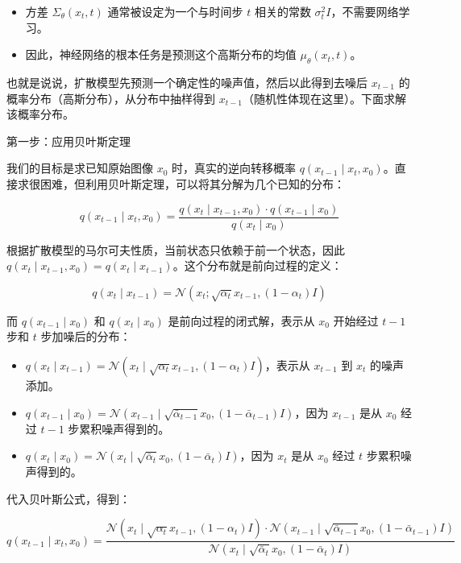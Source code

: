 \begin{itemize}
\tightlist
\item
  方差 \(\Sigma_\theta(x_t,t)\) 通常被设定为一个与时间步 \(t\) 相关的常数 \(\sigma_t^2 I\)，不需要网络学习。
\item
  因此，神经网络的根本任务是预测这个高斯分布的均值 \(\mu_\theta(x_t,t)\)。
\end{itemize}

也就是说说，扩散模型先预测一个确定性的噪声值，然后以此得到去噪后 \(x_{t-1}\) 的概率分布（高斯分布），从分布中抽样得到 \(x_{t-1}\)（随机性体现在这里）。下面求解该概率分布。

第一步：应用贝叶斯定理

我们的目标是求已知原始图像 \(x_0\) 时，真实的逆向转移概率 \(q(x_{t-1}\mid x_t,x_0)\)。直接求很困难，但利用贝叶斯定理，可以将其分解为几个已知的分布：

\[
q(x_{t-1}\mid x_t,x_0)
= \frac{q(x_t\mid x_{t-1},x_0)\cdot q(x_{t-1}\mid x_0)}{q(x_t\mid x_0)}
\]

根据扩散模型的马尔可夫性质，当前状态只依赖于前一个状态，因此 \(q(x_t\mid x_{t-1},x_0)=q(x_t\mid x_{t-1})\)。这个分布就是前向过程的定义：

\[
q(x_t\mid x_{t-1})=\mathcal{N}(x_t;\sqrt{\alpha_t}x_{t-1},(1-\alpha_t)I)
\]

而 \(q(x_{t-1}\mid x_0)\) 和 \(q(x_t\mid x_0)\) 是前向过程的闭式解，表示从 \(x_0\) 开始经过 \(t-1\) 步和 \(t\) 步加噪后的分布：

\begin{itemize}
\tightlist
\item
  \(q(x_t\mid x_{t-1})=\mathcal{N}(x_t\mid\sqrt{\alpha_t}x_{t-1},(1-\alpha_t)I)\)，表示从 \(x_{t-1}\) 到 \(x_t\) 的噪声添加。
\item
  \(q(x_{t-1}\mid x_0)=\mathcal{N}(x_{t-1}\mid\sqrt{\bar{\alpha}_{t-1}}x_0,(1-\bar{\alpha}_{t-1})I)\)，因为 \(x_{t-1}\) 是从 \(x_0\) 经过 \(t-1\) 步累积噪声得到的。
\item
  \(q(x_t\mid x_0)=\mathcal{N}(x_t\mid\sqrt{\bar{\alpha}_t}x_0,(1-\bar{\alpha}_t)I)\)，因为 \(x_t\) 是从 \(x_0\) 经过 \(t\) 步累积噪声得到的。
\end{itemize}

代入贝叶斯公式，得到：

\[
q(x_{t-1}\mid x_t,x_0)
= \frac{
\mathcal{N}(x_t\mid\sqrt{\alpha_t}x_{t-1},(1-\alpha_t)I)\cdot
\mathcal{N}(x_{t-1}\mid\sqrt{\bar{\alpha}_{t-1}}x_0,(1-\bar{\alpha}_{t-1})I)
}{
\mathcal{N}(x_t\mid\sqrt{\bar{\alpha}_t}x_0,(1-\bar{\alpha}_t)I)
}
\]


